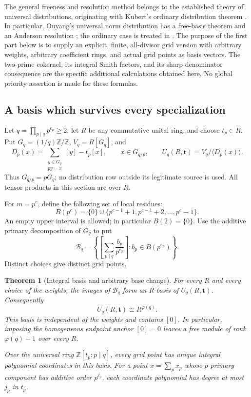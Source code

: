 \documentclass[11pt,a4paper]{article}
\numberwithin{equation}{section}
\theoremstyle{plain}
\newtheorem{theorem}{Theorem}[section]
\theoremstyle{definition}
\theoremstyle{remark}
\begin{document}
The general freeness and resolution method belongs to the established
theory of universal distributions, originating with Kubert's ordinary
distribution theorem \cite{intdist:Kubert1979}. In particular, Ouyang's universal
norm distribution has a free-basis theorem and an Anderson resolution
\cite[Proposition 4.2 and Theorem 5.1]{intdist:Ouyang2002}; the ordinary
case is treated in \cite{intdist:Ouyang2001}. The purpose of the first
part below is to supply an explicit, finite, all-divisor grid version
with arbitrary weights, arbitrary coefficient rings, and actual grid
points as basis vectors. The two-prime cokernel, its integral Smith
factors, and its sharp denominator consequence are the specific
additional calculations obtained here. No global priority assertion is
made for these formulas.

\subsection{A basis which survives every specialization}

Let $q=\prod_{p\mid q}p^{e_p}\ge2$, let $R$ be any commutative unital
ring, and choose $t_p\in R$. Put $G_q=(1/q)\mathbb Z/\mathbb Z$,
$V_q=R[G_q]$, and
\[
 D_p(x)=\sum_{\substack{y\in G_q\\py=x}}[y]-t_p[x],
 \qquad x\in G_{q/p},\qquad
 U_q(R,\mathbf t)=V_q/\langle D_p(x)\rangle.
\]
Thus $G_{q/p}=pG_q$; no distribution row outside its legitimate source
is used. All tensor products in this section are over $R$.

For $m=p^e$, define the following set of local residues:
\begin{equation}\label{intdist:eq:local-basis}
 B(p^e)=\{0\}\cup\{p^{e-1}+1,p^{e-1}+2,\ldots,p^e-1\}.
\end{equation}
An empty upper interval is allowed; in particular $B(2)=\{0\}$.
Use the additive primary decomposition of $G_q$ to put
\begin{equation}\label{intdist:eq:grid-basis}
 \mathcal B_q=
 \left\{\left[\sum_{p\mid q}\frac{b_p}{p^{e_p}}\right]:
                b_p\in B(p^{e_p})\right\}.
\end{equation}
Distinct choices give distinct grid points.

\begin{theorem}[Integral basis and arbitrary base change]
\label{intdist:thm:basis}
For every $R$ and every choice of the weights, the images of
$\mathcal B_q$ form an $R$-basis of $U_q(R,\mathbf t)$. Consequently
\[
 U_q(R,\mathbf t)\cong R^{\varphi(q)}.
\]
This basis is independent of the weights and contains $[0]$. In
particular, imposing the homogeneous endpoint anchor $[0]=0$ leaves a
free module of rank $\varphi(q)-1$ over every $R$.

Over the universal ring $\mathbb Z[t_p:p\mid q]$, every grid point has
unique integral polynomial coordinates in this basis. For a point
$x=\sum_px_p$ whose $p$-primary component has additive order $p^{j_p}$,
each coordinate polynomial has degree at most $j_p$ in $t_p$.
\end{theorem}
\end{document}
